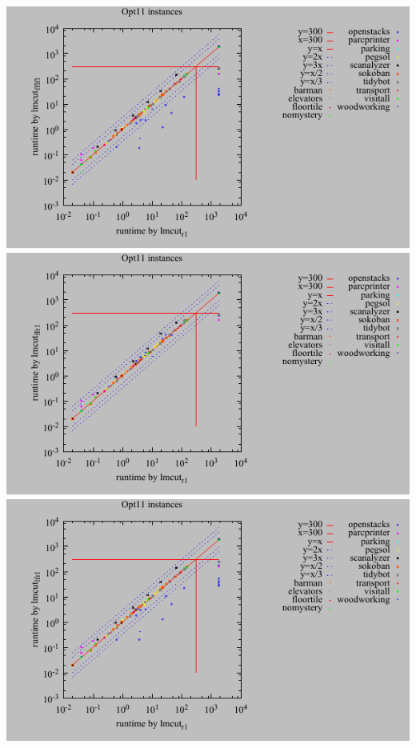 \includegraphics{tables/opt11-time-lmcut_r-lmcut_fflf.pdf}
\linebreak
\includegraphics{tables/opt11-time-lmcut_r-lmcut_ffr.pdf}
\linebreak
\includegraphics{tables/opt11-time-lmcut_r-lmcut_lfr.pdf}
\linebreak
